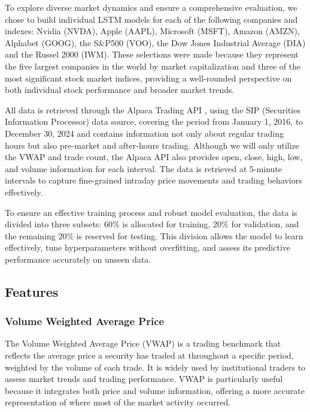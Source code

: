 \documentclass[10pt,a4paper]{article}
\begin{document}
To explore diverse market dynamics and ensure a comprehensive evaluation, we chose to build individual LSTM models for each of the following companies and indexes: Nvidia (NVDA), Apple (AAPL), Microsoft (MSFT), Amazon (AMZN), Alphabet (GOOG), the S\&P500 (VOO), the Dow Jones Industrial Average (DIA) and the Russel 2000 (IWM). These selections were made because they represent the five largest companies in the world by market capitalization and three of the most significant stock market indices, providing a well-rounded perspective on both individual stock performance and broader market trends. 

All data is retrieved through the Alpaca Trading API \cite{alpaca_api}, using the SIP (Securities Information Processor) data source, covering the period from January 1, 2016, to December 30, 2024 and contains information not only about regular trading hours but also pre-market and after-hours trading.  Although we will only utilize the VWAP and trade count, the Alpaca API also provides open, close, high, low, and volume information for each interval. The data is retrieved at 5-minute intervals to capture fine-grained intraday price movements and trading behaviors effectively.

To ensure an effective training process and robust model evaluation, the data is divided into three subsets: 60\% is allocated for training, 20\% for validation, and the remaining 20\% is reserved for testing. This division allows the model to learn effectively, tune hyperparameters without overfitting, and assess its predictive performance accurately on unseen data.

\subsection{Features}

\subsubsection{Volume Weighted Average Price}

The Volume Weighted Average Price (VWAP) is a trading benchmark that reflects the average price a security has traded at throughout a specific period, weighted by the volume of each trade. It is widely used by institutional traders to assess market trends and trading performance. VWAP is particularly useful because it integrates both price and volume information, offering a more accurate representation of where most of the market activity occurred.
\end{document}
